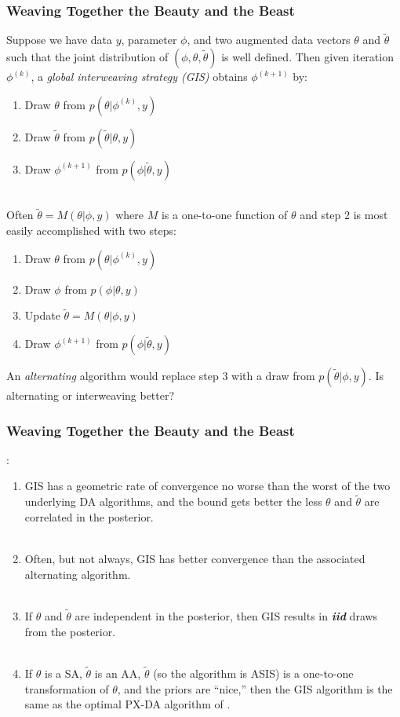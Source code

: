 \documentclass[xcolor=dvipsnames]{beamer}\usepackage{graphicx, color}
\begin{document}
\begin{frame}
  \frametitle{Weaving Together the Beauty and the Beast}
  Suppose we have data $y$, parameter $\phi$, and two augmented data vectors $\theta$ and $\tilde{\theta}$ such that the joint distribution of $(\phi, \theta, \tilde{\theta})$ is well defined. Then given iteration $\phi^{(k)}$, a {\it \color{red} global interweaving strategy (GIS)} obtains $\phi^{(k+1)}$ by:
  \begin{enumerate}
  \item Draw $\theta$ from $p(\theta|\phi^{(k)},y)$
  \item Draw $\tilde{\theta}$ from $p(\tilde{\theta}|\theta,y)$
  \item Draw $\phi^{(k+1)}$ from $p(\phi|\tilde{\theta},y)$\\~\\
  \end{enumerate}
  \pause
  Often $\tilde{\theta}=M(\theta|\phi,y)$ where $M$ is a one-to-one function of $\theta$ and step 2 is most easily accomplished with two steps:
  \begin{enumerate}
  \item Draw $\theta$ from $p(\theta|\phi^{(k)},y)$
  \item Draw $\phi$ from $p(\phi|\theta,y)$
  \item Update $\tilde{\theta}=M(\theta|\phi,y)$
  \item Draw $\phi^{(k+1)}$ from $p(\phi|\tilde{\theta},y)$
  \end{enumerate}
An {\it \color{red} alternating} algorithm would replace step 3 with a draw from $p(\tilde{\theta}|\phi,y)$. Is alternating or interweaving better?
\end{frame}

\begin{frame}
  \frametitle{Weaving Together the Beauty and the Beast}
  \citet{yu2011center}: 
  \begin{enumerate}
  \item  GIS has a geometric rate of convergence no worse than the worst of the two underlying DA algorithms, and the bound gets better the less $\theta$ and $\tilde{\theta}$ are correlated in the posterior.\\~\\
  \item Often, but not always, GIS has better convergence than the associated alternating algorithm.\\~\\
  \item If $\theta$ and $\tilde{\theta}$ are independent in the posterior, then GIS results in \textit{\textbf{iid}} draws from the posterior. \\~\\
  \item If $\theta$ is a SA, $\tilde{\theta}$ is an AA, $\tilde{\theta}$ (so the algorithm is ASIS) is a one-to-one transformation of $\theta$, and the priors are ``nice,'' then the GIS algorithm is the same as the optimal PX-DA algorithm of \citet{liu1999parameter}.
  \end{enumerate}
\end{frame}
\end{document}
